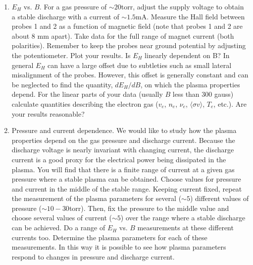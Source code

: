 \documentclass{../lab}
\begin{document}
\begin{enumerate}
    Is the B-I relationship linear? Does it depend on the history current in the magnet? Historically, characterizing this was important because we did not have a Gaussmeter that could operate with the high voltage on and it was necessary to infer the B field from the applied current. Fortunately, in the current apparatus, you can simply read the B field while the Hall Voltage measurement is being made, rather than having to infer it from the current.
    
    \item $E_H$ vs. $B$. For a gas pressure of $\sim 20$torr, adjust the supply voltage to obtain a stable discharge with a current of $\sim 1.5$mA. Measure the Hall field between probes 1 and 2 as a function of magnetic field (note that probes 1 and 2 are about 8 mm apart). Take data for the full range of magnet current (both polarities). Remember to keep the probes near ground potential by adjusting the potentiometer. Plot your results. Is $E_H$ linearly dependent on B? In general $E_H$ can have a large offset due to subtleties such as small lateral misalignment of the probes. However, this offset is generally constant and can be neglected to find the quantity, $dE_H/dB$, on which the plasma properties depend. For the linear parts of your data (usually $B$ less than 300 gauss) calculate quantities describing the electron gas ($v_e$, $n_e$, $\nu_e$, $\langle \sigma v \rangle$, $T_e$, etc.). Are your results reasonable? 

     \item Pressure and current dependence. We would like to study how the plasma properties depend on the gas pressure and discharge current. Because the discharge voltage is nearly invariant with changing current, the discharge current is a good proxy for the electrical power being dissipated in the plasma. You will find that there is a finite range of current at a given gas pressure where a stable plasma can be obtained. Choose values for pressure and current in the middle of the stable range. Keeping current fixed, repeat the measurement of the plasma parameters for several ($\sim 5$) different values of pressure ($\sim 10-30$torr). Then, fix the pressure to the middle value and choose several values of current ($\sim 5$) over the range where a stable discharge can be achieved. Do a range of $E_H$ vs. $B$ measurements at these different currents too. Determine the plasma parameters for each of these measurements. In this way it is possible to see how plasma parameters respond to changes in pressure and discharge current.



\end{enumerate}
\end{document}

